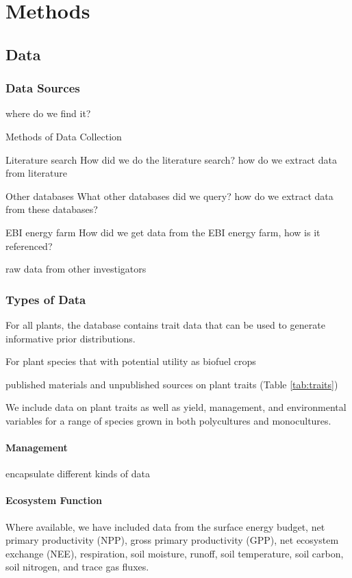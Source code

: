 

\chapter{Methods}

\section{Data}
\subsection{Data Sources}
where do we find it?
\par{Methods of Data Collection}
\par{Literature search} How did we do the literature search?
how do we extract data from literature

\par{Other databases} What other databases did we query?
how do we extract data from these databases?
\par{EBI energy farm} How did we get data from the EBI energy farm, how is it referenced?
\par{raw data} from other investigators

\subsection{Types of Data}
For all plants, the database contains trait data that can be used to generate informative prior distributions.

For plant species that with potential utility as biofuel crops

published materials and unpublished sources on plant traits (Table 
\ref{tab:traits})

We include data on plant traits as well as yield, management, and environmental variables for a range of species grown in both polycultures and monocultures.



\subsubsection{Management}
encapsulate different kinds of data


\subsubsection{Ecosystem Function}
Where available, we have included data from the surface energy budget, net primary productivity (NPP), gross primary productivity (GPP), net ecosystem exchange (NEE), respiration, soil moisture, runoff, soil temperature, soil carbon, soil nitrogen, and trace gas fluxes.

